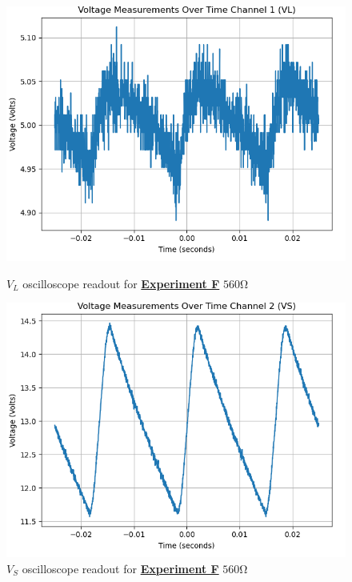 \documentclass[
	letterpaper
	12pt
]{template}
\newcommand{\bref}[2]{\textbf{\hyperref[#1]{#2}}}
\begin{document}
\begin{figure}[H]\label{data::F5}
	\centering
	\begin{minipage}[c]{0.45\textwidth}
		\centering
		\includegraphics[width=\textwidth]{figures/F/5--ch1.png}
	    \caption{$V_L$ oscilloscope readout for \bref{exp::F}{Experiment F} $560\unit{\ohm}$ }
	\end{minipage}
	\hfill
	\begin{minipage}[c]{0.45\textwidth}
		\centering
		\includegraphics[width=\textwidth]{figures/F/5--ch2.png}
	    \caption{$V_S$ oscilloscope readout for \bref{exp::F}{Experiment F} $560\unit{\ohm}$ }
	\end{minipage}
\end{figure}
\end{document}
